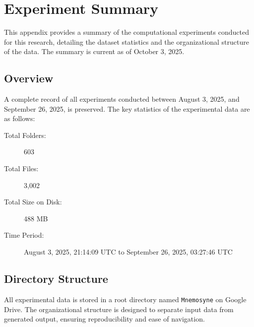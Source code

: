 \chapter{Experiment Summary}
\label{app:exp_summary}


This appendix provides a summary of the computational experiments conducted for this research, detailing the dataset statistics and the organizational structure of the data. The summary is current as of October 3, 2025.

\section{Overview}

A complete record of all experiments conducted between August 3, 2025, and September 26, 2025, is preserved. The key statistics of the experimental data are as follows:

\begin{description}
    \item[Total Folders:] 603
    \item[Total Files:] 3,002
    \item[Total Size on Disk:] 488 MB
    \item[Time Period:] August 3, 2025, 21:14:09 UTC to September 26, 2025, 03:27:46 UTC
\end{description}

\section{Directory Structure}

All experimental data is stored in a root directory named \texttt{Mnemosyne} on Google Drive. The organizational structure is designed to separate input data from generated output, ensuring reproducibility and ease of navigation.

